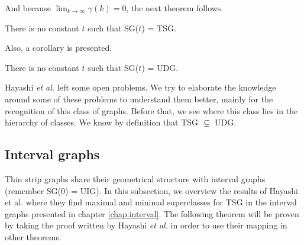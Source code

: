 And because $\lim_{k \to \infty}\gamma(k) = 0$, the next theorem follows.

\begin{theorem}
  There is no constant $t$ such that SG($t$) = TSG.
\end{theorem}

Also, a corollary is presented.

\begin{theorem}
  There is no constant $t$ such that SG($t$) = UDG.
\end{theorem}


Hayashi \textit{et al.} left some open problems. We try to elaborate the knowledge around some of these problems
to understand them better, mainly for the recognition of this class of graphs. Before that, we see where this class lies in the hierarchy of classes. We know by definition that TSG $\subsetneq$ UDG.

\subsection{Interval graphs}

Thin strip graphs share their geometrical structure with interval graphs (remember SG($0$) = UIG). In this subsection, we overview the results of Hayashi et al. \cite{hayashiThinStripGraphs2017} where they find maximal and minimal superclasses for TSG in the interval graphs presented in chapter \ref{chap:interval}. The following theorem will be proven by taking the proof written by Hayashi \textit{et al.} in order to use their mapping in other theorems.

